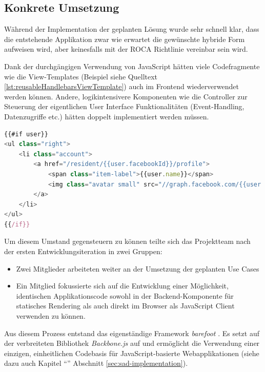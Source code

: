 \subsection*{Konkrete Umsetzung}

Während der Implementation der geplanten Lösung wurde sehr schnell klar, dass die entstehende Applikation zwar wie erwartet die gewünschte hybride Form aufweisen wird, aber keinesfalls mit der ROCA Richtlinie \emph{} vereinbar sein wird.

Dank der durchgängigen Verwendung von JavaScript hätten viele Codefragmente wie die View-Templates (Beispiel siehe Quelltext \ref{lst:reusableHandlebarsViewTemplate}) auch im Frontend wiederverwendet werden können. Andere, logikintensivere Komponenten wie die Controller zur Steuerung der eigentlichen User Interface Funktionalitäten (Event-Handling, Datenzugriffe etc.) hätten doppelt implementiert werden müssen.

\newpage
\begin{lstlisting}[language=JavaScript, firstnumber=31, caption={Ausschnitt aus dem \emph{Handlebars} \cite{Handlebars} Template zur Darstellung von Benutzerinformation in der Menüleiste von \emph{Roomies} \cite{roomiesMenuTemplate}}, label={lst:reusableHandlebarsViewTemplate}]
{{#if user}}
<ul class="right">
	<li class="account">
		<a href="/resident/{{user.facebookId}}/profile">
			<span class="item-label">{{user.name}}</span>
			<img class="avatar small" src="//graph.facebook.com/{{user.facebookId}}/picture" />
		</a>
	</li>
</ul>
{{/if}}
\end{lstlisting}

Um diesem Umstand gegensteuern zu können teilte sich das Projektteam nach der ersten Entwicklungsiteration in zwei Gruppen:

\begin{itemize}
	\item Zwei Mitglieder arbeiteten weiter an der Umsetzung der geplanten Use Cases
	\item Ein Mitglied fokussierte sich auf die Entwicklung einer Möglichkeit, identischen Applikationscode sowohl in der Backend-Komponente für statisches Rendering als auch direkt im Browser als JavaScript Client verwenden zu können.
\end{itemize}

Aus diesem Prozess entstand das eigenständige Framework \emph{barefoot} \cite{Barefoot}. Es setzt auf der verbreiteten Bibliothek \emph{Backbone.js} \cite{Backbonejs} auf und ermöglicht die Verwendung einer einzigen, einheitlichen Codebasis für JavaScript-basierte Webapplikationen (siehe dazu auch Kapitel ``'' Abschnitt \ref{sec:sad-implementation}).

